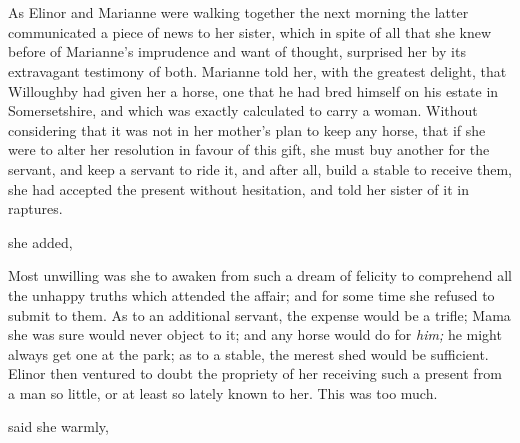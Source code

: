 \chapter{} %

As Elinor and Marianne were walking together the next morning the latter communicated a piece of news to her sister, which in spite of all that she knew before of Marianne's imprudence and want of thought, surprised her by its extravagant testimony of both. Marianne told her, with the greatest delight, that Willoughby had given her a horse, one that he had bred himself on his estate in Somersetshire, and which was exactly calculated to carry a woman. Without considering that it was not in her mother's plan to keep any horse, that if she were to alter her resolution in favour of this gift, she must buy another for the servant, and keep a servant to ride it, and after all, build a stable to receive them, she had accepted the present without hesitation, and told her sister of it in raptures.

 she added, 

Most unwilling was she to awaken from such a dream of felicity to comprehend all the unhappy truths which attended the affair; and for some time she refused to submit to them. As to an additional servant, the expense would be a trifle; Mama she was sure would never object to it; and any horse would do for {\em him;} he might always get one at the park; as to a stable, the merest shed would be sufficient. Elinor then ventured to doubt the propriety of her receiving such a present from a man so little, or at least so lately known to her. This was too much.

 said she warmly, 

